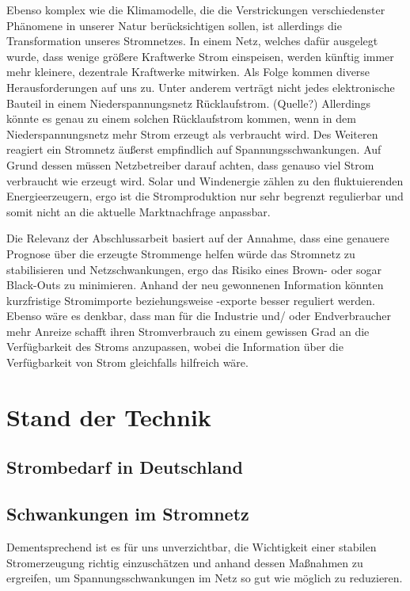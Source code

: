 \documentclass[12pt, a4paper]{article}
\begin{document}
Ebenso komplex wie die Klimamodelle, die die Verstrickungen verschiedenster Phänomene in unserer Natur berücksichtigen sollen, ist allerdings die Transformation unseres Stromnetzes. In einem Netz, welches dafür ausgelegt wurde, dass wenige größere Kraftwerke Strom einspeisen, werden künftig immer mehr kleinere, dezentrale Kraftwerke mitwirken. Als Folge kommen diverse Herausforderungen auf uns zu. Unter anderem verträgt nicht jedes elektronische Bauteil in einem Niederspannungsnetz Rücklaufstrom. (Quelle?) Allerdings könnte es genau zu einem solchen Rücklaufstrom kommen, wenn in dem Niederspannungsnetz mehr Strom erzeugt als verbraucht wird. Des Weiteren reagiert ein Stromnetz äußerst empfindlich auf Spannungsschwankungen. Auf Grund dessen müssen Netzbetreiber darauf achten, dass genauso viel Strom verbraucht wie erzeugt wird. Solar und Windenergie zählen zu den fluktuierenden Energieerzeugern, ergo ist die Stromproduktion nur sehr begrenzt regulierbar und somit nicht an die aktuelle Marktnachfrage anpassbar.

Die Relevanz der Abschlussarbeit basiert auf der Annahme, dass eine genauere Prognose über die erzeugte Strommenge helfen würde das Stromnetz zu stabilisieren und Netzschwankungen, ergo das Risiko eines Brown- oder sogar Black-Outs zu minimieren. Anhand der neu gewonnenen
Information könnten kurzfristige Stromimporte beziehungsweise -exporte besser reguliert werden. Ebenso wäre es denkbar, dass man für die Industrie und/ oder Endverbraucher mehr Anreize schafft ihren Stromverbrauch zu einem gewissen Grad an die Verfügbarkeit des Stroms
anzupassen, wobei die Information über die Verfügbarkeit von Strom gleichfalls hilfreich wäre.


\section{Stand der Technik}

\subsection{Strombedarf in Deutschland}

\subsection{Schwankungen im Stromnetz}

Dementsprechend ist es für uns unverzichtbar, die Wichtigkeit einer stabilen \linebreak Stromerzeugung richtig einzuschätzen und anhand dessen Maßnahmen zu ergreifen, um Spannungsschwankungen im Netz so gut wie möglich zu reduzieren.
\end{document}
